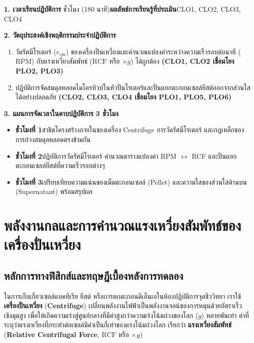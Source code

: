 \cleardoublepage
{}
\begin{planbox}
\noindent\textbf{1. เวลาเรียนปฏิบัติการ} ชั่วโมง (180 นาที)\quad \textbf{ผลลัพธ์การเรียนรู้ที่ประเมิน}\quad CLO1, CLO2, CLO3, CLO4

\noindent\textbf{2. วัตถุประสงค์เชิงพฤติกรรมประจำปฏิบัติการ}
\begin{enumerate}
    \item วัดรัศมีโรเตอร์ ($r_{\text{cm}}$) ของเครื่องปั่นเหวี่ยงและคำนวณแปลงค่าระหว่างความเร็วรอบต่อนาที ($\text{RPM}$) กับแรงเหวี่ยงสัมพัทธ์ ($\text{RCF}$ หรือ $\times g$) ได้ถูกต้อง \textbf{(CLO1, CLO2 เชื่อมโยง PLO2, PLO3)}
    \item ปฏิบัติการจัดสมดุลหลอดไมโครทิวบ์ในหัวปั่นโรเตอร์และปั่นแยกตะกอนเซลล์ยีสต์ออกจากส่วนใสได้อย่างปลอดภัย \textbf{(CLO2, CLO3, CLO4 เชื่อมโยง PLO1, PLO5, PLO6)}
\end{enumerate}

\noindent\textbf{3. แผนการจัดเวลาในคาบปฏิบัติการ 3 ชั่วโมง}
\begin{itemize}
    \item \textbf{ชั่วโมงที่ 1}\quad สาธิตโครงสร้างภายในของเครื่อง Centrifuge การวัดรัศมีโรเตอร์ และกฎเหล็กของการถ่วงสมดุลหลอดตรงข้ามกัน
    \item \textbf{ชั่วโมงที่ 2}\quad ปฏิบัติการวัดรัศมีโรเตอร์ คำนวณตารางแปลงค่า RPM $\leftrightarrow$ RCF และปั่นแยกตะกอนเซลล์ยีสต์ที่ความเร็วรอบต่างๆ
    \item \textbf{ชั่วโมงที่ 3}\quad เปรียบเทียบความแน่นของเม็ดตะกอนเซลล์ (Pellet) และความใสของส่วนใสด้านบน (Supernatant) พร้อมสรุปผล
\end{itemize}
\end{planbox}
\clearpage

\chapter{พลังงานกลและการคำนวณแรงเหวี่ยงสัมพัทธ์ของเครื่องปั่นเหวี่ยง}

\section{หลักการทางฟิสิกส์และทฤษฎีเบื้องหลังการทดลอง}

ในการเก็บเกี่ยวเซลล์แบคทีเรีย ยีสต์ หรือการตกตะกอนดีเอ็นเอในห้องปฏิบัติการจุลชีววิทยา เราใช้\textbf{เครื่องปั่นเหวี่ยง} (\textbf{Centrifuge}) เปลี่ยนพลังงานไฟฟ้าเป็นพลังงานจลน์ของการหมุนด้วยอัตราเร็วเชิงมุมสูง เพื่อให้เกิดความเร่งสู่ศูนย์กลางที่มีค่าสูงกว่าความเร่งโน้มถ่วงของโลก ($g$) หลายพันเท่า ค่าที่ระบุว่าแรงเหวี่ยงที่กระทำต่อเซลล์มีค่าเป็นกี่เท่าของแรงโน้มถ่วงโลก เรียกว่า \textbf{แรงเหวี่ยงสัมพัทธ์} (\textbf{Relative Centrifugal Force}, $\text{RCF}$ หรือ $\times g$)

